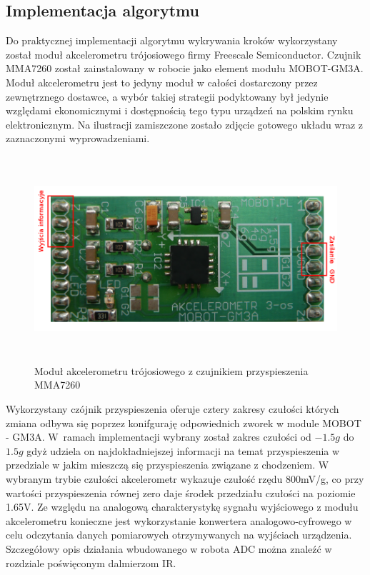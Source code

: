 \subsection{Implementacja algorytmu}
Do praktycznej implementacji algorytmu wykrywania kroków wykorzystany został
moduł akcelerometru trójosiowego firmy Freescale Semiconductor. Czujnik 
MMA7260\cite{MMA7260DataSheet} został zainstalowany w robocie jako element
modułu MOBOT-GM3A. Moduł akcelerometru jest to jedyny moduł w całości
dostarczony przez zewnętrznego dostawce, a wybór takiej strategii podyktowany
był jedynie względami ekonomicznymi i dostępnością tego typu urządzeń na polskim
rynku elektronicznym. Na ilustracji zamiszczone zostało zdjęcie gotowego układu
wraz z zaznaczonymi wyprowadzeniami.

\begin{figure}[ht!]
 \centering
 \includegraphics[height=76mm]{../images/ch04/gm3a_view.png}
 \caption{Moduł akcelerometru trójosiowego z czujnikiem przyspieszenia MMA7260}
 \label{fig:AccView}
\end{figure}

Wykorzystany czójnik przyspieszenia oferuje cztery zakresy czułości których
zmiana odbywa się poprzez konifguraję odpowiednich zworek w module MOBOT - GM3A.
W~ramach implementacji wybrany został zakres czułości od $-1.5g$ do $1.5g$ gdyż
udziela on najdokładniejszej informacji na temat przyspieszenia w przedziale w
jakim mieszczą się przyspieszenia związane z chodzeniem. W wybranym trybie
czułości akcelerometr wykazuje czułość rzędu 800mV/g, co przy wartości
przyspieszenia równej zero daje środek przedziału czułości na poziomie 1.65V.
Ze względu na analogową charakterystykę sygnału wyjściowego z modułu
akcelerometru konieczne jest wykorzystanie konwertera analogowo-cyfrowego w
celu odczytania danych pomiarowych otrzymywanych na wyjściach urządzenia.
Szczegółowy opis działania wbudowanego w robota ADC można znaleźć w rozdziale
poświęconym dalmierzom IR. 

